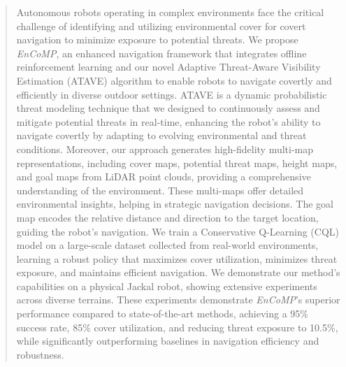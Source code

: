 \begin{abstract}
Autonomous robots operating in complex environments face the critical challenge of identifying and utilizing environmental cover for covert navigation to minimize exposure to potential threats. We propose \textit{EnCoMP}, an enhanced navigation framework that integrates offline reinforcement learning and our novel Adaptive Threat-Aware Visibility Estimation (ATAVE) algorithm to enable robots to navigate covertly and efficiently in diverse outdoor settings. ATAVE is a dynamic probabilistic threat modeling technique that we designed to continuously assess and mitigate potential threats in real-time, enhancing the robot's ability to navigate covertly by adapting to evolving environmental and threat conditions. Moreover, our approach generates high-fidelity multi-map representations, including cover maps, potential threat maps, height maps, and goal maps from LiDAR point clouds, providing a comprehensive understanding of the environment. These multi-maps offer detailed environmental insights, helping in strategic navigation decisions. The goal map encodes the relative distance and direction to the target location, guiding the robot's navigation. We train a Conservative Q-Learning (CQL) model on a large-scale dataset collected from real-world environments, learning a robust policy that maximizes cover utilization, minimizes threat exposure, and maintains efficient navigation. We demonstrate our method’s capabilities on a physical Jackal robot, showing extensive experiments across diverse terrains. These experiments demonstrate \textit{EnCoMP}'s superior performance compared to state-of-the-art methods, achieving a 95\% success rate, 85\% cover utilization, and reducing threat exposure to 10.5\%, while significantly outperforming baselines in navigation efficiency and robustness.


\end{abstract}